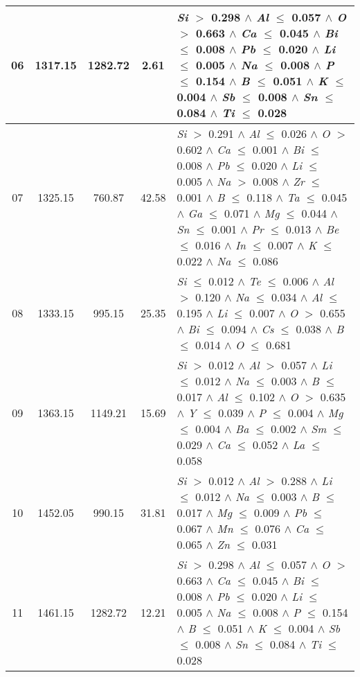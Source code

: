 \begin{table}[!htbp]
\begin{tabular}{ccccm{}}
		\hline
		06 & 1317.15 & 1282.72 & 2.61 & \textit{Si} $>$ 0.298 $\wedge$ \textit{Al} $\le$ 0.057 $\wedge$ \textit{O} $>$ 0.663 $\wedge$ \textit{Ca} $\le$ 0.045 $\wedge$ \textit{Bi} $\le$ 0.008 $\wedge$ \textit{Pb} $\le$ 0.020 $\wedge$ \textit{Li} $\le$ 0.005 $\wedge$ \textit{Na} $\le$ 0.008 $\wedge$ \textit{P} $\le$ 0.154 $\wedge$ \textit{B} $\le$ 0.051 $\wedge$ \textit{K} $\le$ 0.004 $\wedge$ \textit{Sb} $\le$ 0.008 $\wedge$ \textit{Sn} $\le$ 0.084 $\wedge$ \textit{Ti} $\le$ 0.028\\
		\hline
		07 & 1325.15 & 760.87 & 42.58 & \textit{Si} $>$ 0.291 $\wedge$ \textit{Al} $\le$ 0.026 $\wedge$ \textit{O} $>$ 0.602 $\wedge$ \textit{Ca} $\le$ 0.001 $\wedge$ \textit{Bi} $\le$ 0.008 $\wedge$ \textit{Pb} $\le$ 0.020 $\wedge$ \textit{Li} $\le$ 0.005 $\wedge$ \textit{Na} $>$ 0.008 $\wedge$ \textit{Zr} $\le$ 0.001 $\wedge$ \textit{B} $\le$ 0.118 $\wedge$ \textit{Ta} $\le$ 0.045 $\wedge$ \textit{Ga} $\le$ 0.071 $\wedge$ \textit{Mg} $\le$ 0.044 $\wedge$ \textit{Sn} $\le$ 0.001 $\wedge$ \textit{Pr} $\le$ 0.013 $\wedge$ \textit{Be} $\le$ 0.016 $\wedge$ \textit{In} $\le$ 0.007 $\wedge$ \textit{K} $\le$ 0.022 $\wedge$ \textit{Na} $\le$ 0.086\\
		\hline
		08 & 1333.15 & 995.15 & 25.35 & \textit{Si} $\le$ 0.012 $\wedge$ \textit{Te} $\le$ 0.006 $\wedge$ \textit{Al} $>$ 0.120 $\wedge$ \textit{Na} $\le$ 0.034 $\wedge$ \textit{Al} $\le$ 0.195 $\wedge$ \textit{Li} $\le$ 0.007 $\wedge$ \textit{O} $>$ 0.655 $\wedge$ \textit{Bi} $\le$ 0.094 $\wedge$ \textit{Cs} $\le$ 0.038 $\wedge$ \textit{B} $\le$ 0.014 $\wedge$ \textit{O} $\le$ 0.681\\
		\hline
		09 & 1363.15 & 1149.21 & 15.69 & \textit{Si} $>$ 0.012 $\wedge$ \textit{Al} $>$ 0.057 $\wedge$ \textit{Li} $\le$ 0.012 $\wedge$ \textit{Na} $\le$ 0.003 $\wedge$ \textit{B} $\le$ 0.017 $\wedge$ \textit{Al} $\le$ 0.102 $\wedge$ \textit{O} $>$ 0.635 $\wedge$ \textit{Y} $\le$ 0.039 $\wedge$ \textit{P} $\le$ 0.004 $\wedge$ \textit{Mg} $\le$ 0.004 $\wedge$ \textit{Ba} $\le$ 0.002 $\wedge$ \textit{Sm} $\le$ 0.029 $\wedge$ \textit{Ca} $\le$ 0.052 $\wedge$ \textit{La} $\le$ 0.058\\
		\hline
		10 & 1452.05 & 990.15 & 31.81 & \textit{Si} $>$ 0.012 $\wedge$ \textit{Al} $>$ 0.288 $\wedge$ \textit{Li} $\le$ 0.012 $\wedge$ \textit{Na} $\le$ 0.003 $\wedge$ \textit{B} $\le$ 0.017 $\wedge$ \textit{Mg} $\le$ 0.009 $\wedge$ \textit{Pb} $\le$ 0.067 $\wedge$ \textit{Mn} $\le$ 0.076 $\wedge$ \textit{Ca} $\le$ 0.065 $\wedge$ \textit{Zn} $\le$ 0.031\\
		\hline
		11 & 1461.15 & 1282.72 & 12.21 & \textit{Si} $>$ 0.298 $\wedge$ \textit{Al} $\le$ 0.057 $\wedge$ \textit{O} $>$ 0.663 $\wedge$ \textit{Ca} $\le$ 0.045 $\wedge$ \textit{Bi} $\le$ 0.008 $\wedge$ \textit{Pb} $\le$ 0.020 $\wedge$ \textit{Li} $\le$ 0.005 $\wedge$ \textit{Na} $\le$ 0.008 $\wedge$ \textit{P} $\le$ 0.154 $\wedge$ \textit{B} $\le$ 0.051 $\wedge$ \textit{K} $\le$ 0.004 $\wedge$ \textit{Sb} $\le$ 0.008 $\wedge$ \textit{Sn} $\le$ 0.084 $\wedge$ \textit{Ti} $\le$ 0.028\\
		\bottomrule
	\end{tabular}
\end{table}

